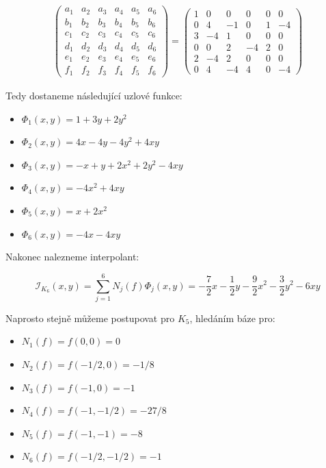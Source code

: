 \documentclass[../main.tex]{subfiles}
\begin{document}
\begin{gather*}
        \left(\begin{matrix}
            a_1 & a_2 & a_3 & a_4 & a_5 & a_6 \\
            b_1 & b_2 & b_3 & b_4 & b_5 & b_6 \\
            c_1 & c_2 & c_3 & c_4 & c_5 & c_6 \\
            d_1 & d_2 & d_3 & d_4 & d_5 & d_6 \\
            e_1 & e_2 & e_3 & e_4 & e_5 & e_6 \\
            f_1 & f_2 & f_3 & f_4 & f_5 & f_6 
            \end{matrix}\right)
        =
        \left(\begin{matrix}
            1 & 0 & 0 & 0 & 0 & 0 \\
            0 & 4 & -1 & 0 & 1 & -4 \\
            3 & -4 & 1 & 0 & 0 & 0 \\
            0 & 0 & 2 & -4 & 2 & 0 \\
            2 & -4 & 2 & 0 & 0 & 0 \\
            0 & 4 & -4 & 4 & 0 & -4
            \end{matrix}\right)
\end{gather*}


Tedy dostaneme následující uzlové funkce: 

\begin{itemize}
    \item $\Phi_1(x,y) = 1 + 3y + 2y^2$
    \item $\Phi_2(x,y) = 4x -4y -4y^2 +4xy$
    \item $\Phi_3(x,y) = -x+y+2x^2+2y^2-4xy$
    \item $\Phi_4(x,y) = -4x^2+4xy$
    \item $\Phi_5(x,y) = x+2x^2$
    \item $\Phi_6(x,y) = -4x-4xy$
\end{itemize}

Nakonec nalezneme interpolant:

\begin{equation}\label{eq:interpolant1}
    \mathcal{I}_{K_6}(x,y) = \sum_{j=1}^{6} N_j(f) \Phi_j(x,y) = -\frac{7}{2}x -\frac{1}{2}y -\frac{9}{2}x^2-\frac{3}{2}y^2-6xy
\end{equation}


Naprosto stejně můžeme postupovat pro $K_5$, hledáním báze pro:

\begin{itemize}
    \item $N_1(f) = f (0,0) = 0 $
    \item $N_2(f) = f (-1/2,0) = -1/8$
    \item $N_3(f) = f (-1,0) = -1$
    \item $N_4(f) = f (-1,-1/2) = -27/8$
    \item $N_5(f) = f (-1,-1) = -8$
    \item $N_6(f) = f (-1/2,-1/2) = -1$
\end{itemize}
\end{document}
